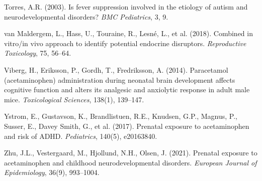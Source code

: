 \documentclass[12pt]{article}
\begin{document}
\begin{thebibliography}{99}
Torres, A.R. (2003).
Is fever suppression involved in the etiology of autism and neurodevelopmental disorders?
\textit{BMC Pediatrics}, 3, 9.

van Maldergem, L., Hass, U., Touraine, R., Lesné, L., et al. (2018).
Combined in vitro/in vivo approach to identify potential endocrine disruptors.
\textit{Reproductive Toxicology}, 75, 56--64.

Viberg, H., Eriksson, P., Gordh, T., Fredriksson, A. (2014).
Paracetamol (acetaminophen) administration during neonatal brain development affects cognitive function and alters its analgesic and anxiolytic response in adult male mice.
\textit{Toxicological Sciences}, 138(1), 139--147.

Ystrom, E., Gustavson, K., Brandlistuen, R.E., Knudsen, G.P., Magnus, P., Susser, E., Davey Smith, G., et al. (2017).
Prenatal exposure to acetaminophen and risk of ADHD.
\textit{Pediatrics}, 140(5), e20163840.

Zhu, J.L., Vestergaard, M., Hjollund, N.H., Olsen, J. (2021).
Prenatal exposure to acetaminophen and childhood neurodevelopmental disorders.
\textit{European Journal of Epidemiology}, 36(9), 993--1004.

\end{thebibliography}
\end{document}
